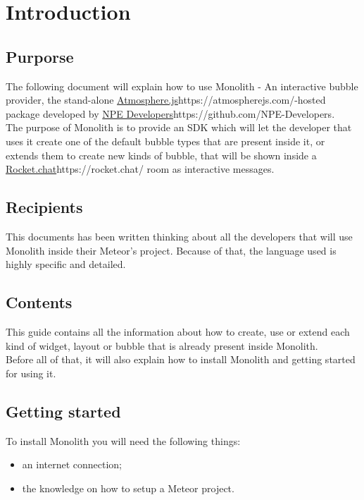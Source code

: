 \section{Introduction}
\subsection{Purporse}
The following document will explain how to use Monolith - An interactive bubble provider, the stand-alone \url{Atmosphere.js}{https://atmospherejs.com/}-hosted package developed by \url{NPE Developers}{https://github.com/NPE-Developers}. \\

The purpose of Monolith is to provide an SDK which will let the developer that uses it create one of the default bubble types that are present inside it, or extends them to create new kinds of bubble, that will be shown inside a \url{Rocket.chat}{https://rocket.chat/} room as interactive messages.

\subsection{Recipients}
This documents has been written thinking about all the developers that will use Monolith inside their Meteor's project. Because of that, the language used is highly specific and detailed.

\subsection{Contents}
This guide contains all the information about how to create, use or extend each kind of widget, layout or bubble that is already present inside Monolith. \\
Before all of that, it will also explain how to install Monolith and getting started for using it.

\subsection{Getting started}
To install Monolith you will need the following things:
\begin{itemize}
	\item an internet connection;
	\item the knowledge on how to setup a Meteor project.
\end{itemize}

